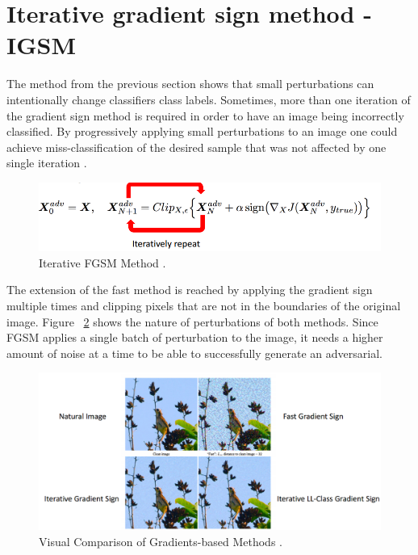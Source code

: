 \section{Iterative gradient sign method - IGSM}

The method from the previous section shows that small perturbations can intentionally change classifiers class labels. Sometimes, more than one iteration of the gradient sign method is required in order to have an image being incorrectly classified. By progressively applying small perturbations to an image one could achieve miss-classification of the desired sample that was not affected by one single iteration \cite{goodfellow2016}. 

\begin{figure}[!h]
	\centering
	\includegraphics[scale=0.6]{iter_fgsm.png}
	\caption{Iterative FGSM Method \cite{goodfellow2016}.}
	\label{fig:iter_fgsm_craft}
\end{figure}
The extension of the fast method is reached by applying the gradient sign multiple times and clipping pixels that are not in the boundaries of the original image. Figure ~\ref{fig:iter_single_comp} shows the nature of perturbations of both methods. Since FGSM applies a single batch of perturbation to the image, it needs a higher amount of noise at a time to be able to successfully generate an adversarial.
\begin{figure}[!h]
	\centering
	\includegraphics[scale=0.4]{iter_single.png}
	\caption{Visual Comparison of Gradients-based Methods \cite{goodfellow2016}.}
	\label{fig:iter_single_comp}
\end{figure}



